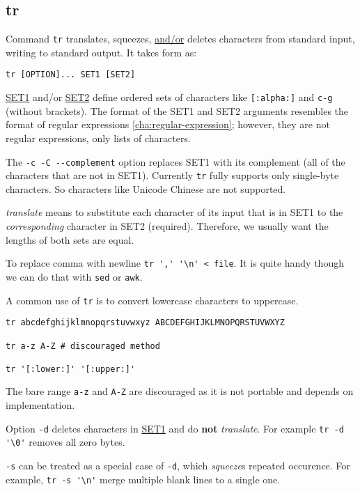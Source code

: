 \subsection{tr}
\label{sec:bash-tr}

Command \lstinline|tr| translates, squeezes, \uline{and/or}
deletes characters from standard input, writing to standard
output. It takes form as:

\begin{lstlisting}
tr [OPTION]... SET1 [SET2]
\end{lstlisting}

\uline{SET1} and/or \uline{SET2} define ordered sets of characters
like \lstinline|[:alpha:]| and \lstinline|c-g| (without
brackets). The format of the SET1 and SET2 arguments resembles the
format of regular expressions \ref{cha:regular-expression};
however, they are not regular expressions, only lists of
characters.

The \lstinline|-c -C --complement| option replaces SET1 with its
complement (all of the characters that are not in SET1). Currently
\lstinline|tr| fully supports only single-byte characters. So
characters like Unicode Chinese are not supported.

\textit{translate} means to substitute each character of its input
that is in SET1 to the \textit{corresponding} character in SET2
(required). Therefore, we usually want the lengths of both sets
are equal.

To replace comma with newline \lstinline|tr ',' '\n' < file|. It
is quite handy though we can do that with \lstinline|sed| or
\lstinline|awk|.

A common use of \lstinline|tr| is to convert lowercase characters to
uppercase.

\begin{lstlisting}
tr abcdefghijklmnopqrstuvwxyz ABCDEFGHIJKLMNOPQRSTUVWXYZ

tr a-z A-Z # discouraged method

tr '[:lower:]' '[:upper:]'
\end{lstlisting}

The bare range \verb|a-z| and \verb|A-Z| are discouraged as it is
not portable and depends on implementation.

Option \lstinline|-d| deletes characters in \uline{SET1} and do
\textbf{not} \textit{translate}. For example
\lstinline|tr -d '\0'| removes all zero bytes.

\lstinline|-s| can be treated as a special case of \lstinline|-d|,
which \textit{squeeze}s repeated occurence. For example,
\lstinline|tr -s '\n'| merge multiple blank lines to a single one.

